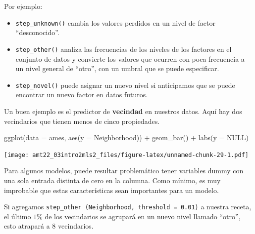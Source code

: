 \documentclass[
]{book}
\newenvironment{Shaded}{\begin{snugshade}}{\end{snugshade}}
\newcommand{\AttributeTok}[1]{\textcolor[rgb]{0.77,0.63,0.00}{#1}}
\newcommand{\ConstantTok}[1]{\textcolor[rgb]{0.00,0.00,0.00}{#1}}
\newcommand{\FunctionTok}[1]{\textcolor[rgb]{0.00,0.00,0.00}{#1}}
\newcommand{\NormalTok}[1]{#1}
\newcommand{\SpecialCharTok}[1]{\textcolor[rgb]{0.00,0.00,0.00}{#1}}
\begin{document}
Por ejemplo:

\begin{itemize}
\item
  \texttt{step\_unknown()} cambia los valores perdidos en un nivel de factor ``desconocido''.
\item
  \texttt{step\_other()} analiza las frecuencias de los niveles de los factores en el conjunto de datos y convierte los valores que ocurren con poca frecuencia a un nivel general de ``otro'', con un umbral que se puede especificar.
\item
  \texttt{step\_novel()} puede asignar un nuevo nivel si anticipamos que se puede encontrar un nuevo factor en datos futuros.
\end{itemize}

Un buen ejemplo es el predictor de \textbf{vecindad} en nuestros datos. Aquí hay dos vecindarios que tienen menos de cinco propiedades.

\begin{Shaded}
\begin{Highlighting}[]
\FunctionTok{ggplot}\NormalTok{(}\AttributeTok{data =}\NormalTok{ ames, }\FunctionTok{aes}\NormalTok{(}\AttributeTok{y =}\NormalTok{ Neighborhood)) }\SpecialCharTok{+} 
  \FunctionTok{geom\_bar}\NormalTok{() }\SpecialCharTok{+} 
  \FunctionTok{labs}\NormalTok{(}\AttributeTok{y =} \ConstantTok{NULL}\NormalTok{)}
\end{Highlighting}
\end{Shaded}

\texttt{[image: amt22\_03intro2mls2\_files/figure-latex/unnamed-chunk-29-1.pdf]}

Para algunos modelos, puede resultar problemático tener variables dummy con una sola entrada distinta de cero en la columna. Como mínimo, es muy improbable que estas características sean importantes para un modelo.

Si agregamos \texttt{step\_other\ (Neighborhood,\ threshold\ =\ 0.01)} a nuestra receta, el último \(1\%\) de los vecindarios se agrupará en un nuevo nivel llamado ``otro'', esto atrapará a 8 vecindarios.
\end{document}
